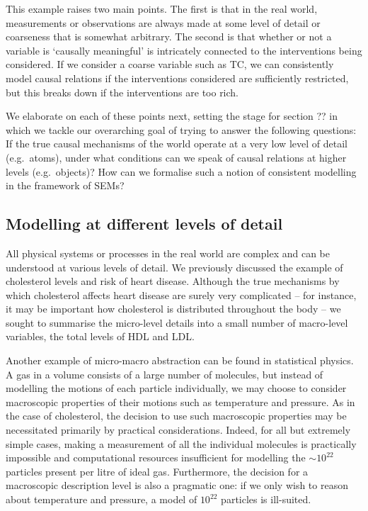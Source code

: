 This example raises two main points. The first is that in the real world, measurements or observations are always made at some level of detail or coarseness that is somewhat arbitrary.
The second is that whether or not a variable is `causally meaningful' is intricately connected to the interventions being considered. If we consider a coarse variable such as TC, we can consistently model causal relations if the interventions considered are sufficiently restricted, but this breaks down if the interventions are too rich. 

We elaborate on each of these points next, 
setting the stage for section ?? in which we tackle our overarching goal of trying to answer the following questions:
If the true causal mechanisms of the world operate at a very low level of detail (e.g.~atoms), under what conditions can we speak of causal relations at higher levels (e.g.~objects)?
How can we formalise such a notion of consistent modelling in the framework of SEMs?


\subsection{Modelling at different levels of detail}

All physical systems or processes in the real world are complex and can be understood at various levels of detail.
We previously discussed the example of cholesterol levels and risk of heart disease.
Although the true mechanisms by which cholesterol affects heart disease are surely very complicated -- for instance, it may be important how cholesterol is distributed throughout the body -- we sought to summarise the micro-level details into a small number of macro-level variables, the total levels of HDL and LDL.

Another example of micro-macro abstraction 
can be found in statistical physics.
A gas in a volume consists of a large number of molecules, but instead of modelling the motions of each particle individually, we may choose to consider macroscopic properties of their motions such as temperature and pressure.
As in the case of cholesterol, the decision to use such macroscopic properties may be necessitated primarily by practical considerations.
Indeed, for all but extremely simple cases, making a measurement of all the individual molecules is practically impossible and computational resources insufficient for modelling the ${\sim}10^{22}$ particles present per litre of ideal gas.
Furthermore, the decision for a macroscopic description level is also a pragmatic one: if we only wish to reason about temperature and pressure, a model of $10^{22}$ particles is ill-suited.

